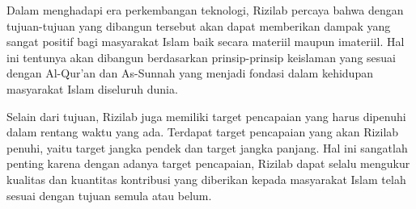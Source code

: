 \documentclass[Rizilab.tex]{subfile}
\begin{document}
Dalam menghadapi era perkembangan teknologi, Rizilab percaya bahwa dengan tujuan-tujuan yang dibangun tersebut akan dapat memberikan dampak yang sangat positif bagi masyarakat Islam baik secara materiil maupun imateriil. Hal ini tentunya akan dibangun berdasarkan prinsip-prinsip keislaman yang sesuai dengan Al-Qur'an dan As-Sunnah yang menjadi fondasi dalam kehidupan masyarakat Islam diseluruh dunia.

Selain dari tujuan, Rizilab juga memiliki target pencapaian yang harus dipenuhi dalam rentang waktu yang ada. Terdapat target pencapaian yang akan Rizilab penuhi, yaitu target jangka pendek dan target jangka panjang. Hal ini sangatlah penting karena dengan adanya target pencapaian, Rizilab dapat selalu mengukur kualitas dan kuantitas kontribusi yang diberikan kepada masyarakat Islam telah sesuai dengan tujuan semula atau belum.
\end{document}
